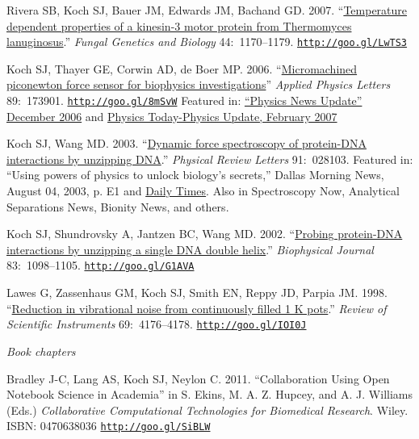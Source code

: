 \documentclass[11pt]{article}
\begin{document}
\ind Rivera SB, Koch SJ, Bauer JM, Edwards JM, Bachand GD. 2007. ``\href{http://goo.gl/LwTS3}{Temperature dependent properties of a kinesin-3 motor protein from Thermomyces lanuginosus}.'' \emph{Fungal Genetics and Biology} 44:~1170–1179. {\scriptsize  \texttt{\href{http://goo.gl/LwTS3}{http://goo.gl/LwTS3}}}


\ind Koch SJ, Thayer GE, Corwin AD, de Boer MP. 2006. ``\href{http://goo.gl/8mSvW}{Micromachined piconewton force sensor for biophysics investigations}'' \newline \emph{Applied Physics Letters} 89:~173901. {\scriptsize  \texttt{\href{http://goo.gl/8mSvW}{http://goo.gl/8mSvW}}} \newline Featured in: \href{http://goo.gl/2m7LF}{“Physics News Update” December 2006} and \href{http://goo.gl/lYdCy}{Physics Today-Physics Update, February 2007}  


\ind Koch SJ, Wang MD. 2003. ``\href{http://goo.gl/XanG0}{Dynamic force spectroscopy of protein-DNA interactions by unzipping DNA}.'' \emph{Physical Review Letters} 91:~028103.  Featured in: “Using powers of physics to unlock biology's secrets,” Dallas Morning News, August 04, 2003, p. E1 and \href{http://goo.gl/2m7LF}{Daily Times}. Also in Spectroscopy Now, Analytical Separations News, Bionity News, and others.


\ind Koch SJ, Shundrovsky A, Jantzen BC, Wang MD. 2002.  ``\href{http://goo.gl/G1AVA}{Probing protein-DNA interactions by unzipping a single DNA double helix}.'' \emph{Biophysical Journal} 83:~1098–1105. {\scriptsize  \texttt{\href{http://goo.gl/G1AVA}{http://goo.gl/G1AVA}}}


\ind Lawes G, Zassenhaus GM, Koch SJ, Smith EN, Reppy JD, Parpia JM. 1998. ``\href{http://goo.gl/IOI0J}{Reduction in vibrational noise from continuously filled 1 K pots}.''  \emph{Review of Scientific Instruments}
69:~4176–4178. {\scriptsize  \texttt{\href{http://goo.gl/IOI0J}{http://goo.gl/IOI0J}}}



\bigskip

\noindent\emph{Book chapters \vspace{0.05in}}

\ind Bradley J-C, Lang AS, Koch SJ, Neylon C. 2011. ``Collaboration Using Open Notebook Science in Academia'' in S. Ekins, M. A. Z. Hupcey, and A. J. Williams (Eds.) \emph{Collaborative Computational Technologies for Biomedical Research}. Wiley. ISBN: 0470638036 {\scriptsize  \texttt{\href{http://goo.gl/SiBLW}{http://goo.gl/SiBLW}}}
\end{document}
